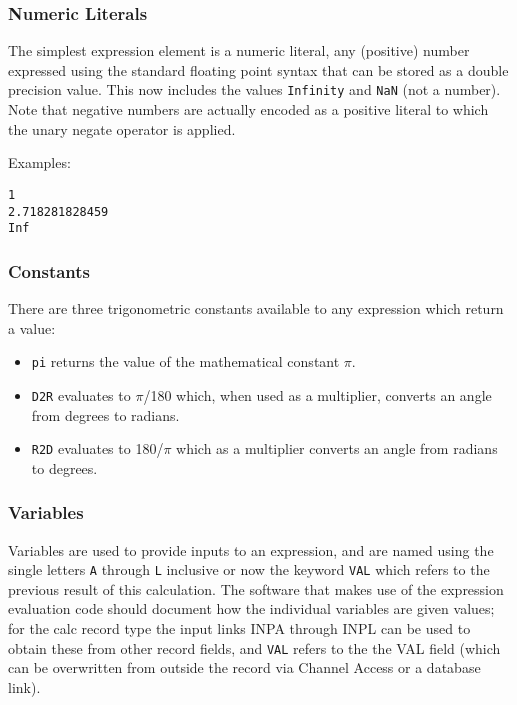 \subsubsection{Numeric Literals}

The simplest expression element is a numeric literal, any (positive) number expressed using the standard floating point 
syntax that can be stored as a double precision value. This now includes the values \verb|Infinity| and \verb|NaN| (not a number). 
Note that negative numbers are actually encoded as a positive literal to which the unary negate operator is applied.

Examples:

\begin{verbatim}
1
2.718281828459
Inf
\end{verbatim}

\subsubsection{Constants}

There are three trigonometric constants available to any expression which return a value:

\begin{itemize}
\item \verb|pi| returns the value of the mathematical constant $\pi$.

\item \verb|D2R| evaluates to $\pi$/180 which, when used as a multiplier, converts an angle from degrees to radians.

\item \verb|R2D| evaluates to 180/$\pi$ which as a multiplier converts an angle from radians to degrees.

\end{itemize}

\subsubsection{Variables}

Variables are used to provide inputs to an expression, and are named using the single letters \verb|A| through \verb|L| inclusive or now 
the keyword \verb|VAL| which refers to the previous result of this calculation. The software that makes use of the expression 
evaluation code should document how the individual variables are given values; for the calc record type the input links 
INPA through INPL can be used to obtain these from other record fields, and \verb|VAL| refers to the the VAL field (which can 
be overwritten from outside the record via Channel Access or a database link).

